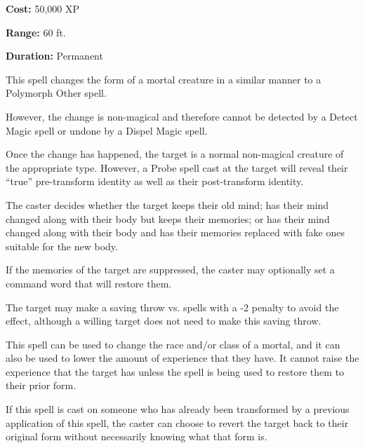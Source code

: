 \begin{multicols*}{2}
{\textbf{Cost:} 50,000 XP

\textbf{Range:} 60 ft.

\textbf{Duration:} Permanent}

This spell changes the form of a mortal creature in a similar manner to a Polymorph Other spell.

However, the change is non-magical and therefore cannot be detected by a Detect Magic spell or undone by a Dispel Magic spell.

Once the change has happened, the target is a normal non-magical creature of the appropriate type. However, a Probe spell cast at the target will reveal their “true” pre-transform identity as well as their post-transform identity.

The caster decides whether the target keeps their old mind; has their mind changed along with their body but keeps their memories; or has their mind changed along with their body and has their memories replaced with fake ones suitable for the new body.

If the memories of the target are suppressed, the caster may optionally set a command word that will restore them.

The target may make a saving throw vs. spells with a -2 penalty to avoid the effect, although a willing target does not need to make this saving throw.

This spell can be used to change the race and/or class of a mortal, and it can also be used to lower the amount of experience that they have. It cannot raise the experience that the target has unless the spell is being used to restore them to their prior form.

If this spell is cast on someone who has already been transformed by a previous application of this spell, the caster can choose to revert the target back to their original form without necessarily knowing what that form is.

\end{multicols*}

